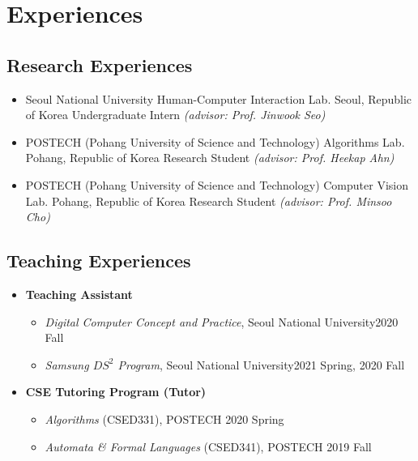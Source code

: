 \documentclass[11pt,a4paper,sans]{moderncv}
\newcommand{\postech}{POSTECH (Pohang University of Science and Technology)}
\newcommand{\snu}{Seoul National University}
\newcommand{\pohang}{Pohang, Republic of Korea}
\newcommand{\seoul}{Seoul, Republic of Korea}
\begin{document}
\section{Experiences}
\vspace{6pt}
\subsection{Research Experiences}
\vspace{5pt}

\begin{itemize}

\item{
              {\snu}
              {Human-Computer Interaction Lab.}
              {\seoul}
              {}
              {Undergraduate Intern \textit{(advisor: Prof. Jinwook Seo)}}}
\vspace{4mm}

\item{
              {\postech}
              {Algorithms Lab.}
              {\pohang}
              {}
              {Research Student \textit{(advisor: Prof. Heekap Ahn)}}}
\vspace{4mm}

\item{
              {\postech}
              {Computer Vision Lab.}
              {\pohang}
              {}
              {Research Student \textit{(advisor: Prof. Minsoo Cho)}}}
\vspace{4mm}

\end{itemize}

\subsection{Teaching Experiences}
\vspace{5pt}
\begin{itemize}

\item \textbf{Teaching Assistant}
\vspace{-2mm}
\begin{itemize}
    \item \textit{Digital Computer Concept and Practice}, \snu \hfill 2020 Fall
    \item \textit{Samsung $\textit{DS}^2$ Program}, \snu \hfill 2021 Spring, 2020 Fall
\end{itemize}


\item \textbf{CSE Tutoring Program (Tutor)}
\vspace{-2mm}
\begin{itemize}
    \item \textit{Algorithms} (CSED331), POSTECH \hfill 2020 Spring
    \item \textit{Automata \& Formal Languages} (CSED341), POSTECH \hfill 2019 Fall
\end{itemize}

\vspace{4mm}


\end{itemize}
\end{document}
